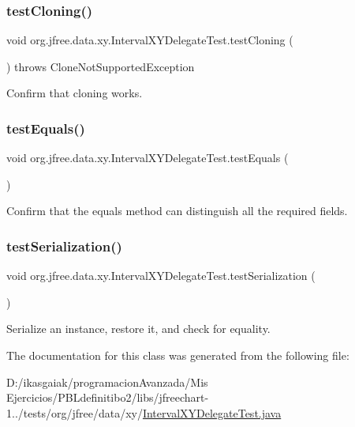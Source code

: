 \subsubsection{\texorpdfstring{test\+Cloning()}{testCloning()}}
{\footnotesize\ttfamily void org.\+jfree.\+data.\+xy.\+Interval\+X\+Y\+Delegate\+Test.\+test\+Cloning (\begin{DoxyParamCaption}{ }\end{DoxyParamCaption}) throws Clone\+Not\+Supported\+Exception}

Confirm that cloning works. \mbox{\label{classorg_1_1jfree_1_1data_1_1xy_1_1_interval_x_y_delegate_test_a9f0fd060226fb1b6f5d3c6d4da700bbd}} 
\subsubsection{\texorpdfstring{test\+Equals()}{testEquals()}}
{\footnotesize\ttfamily void org.\+jfree.\+data.\+xy.\+Interval\+X\+Y\+Delegate\+Test.\+test\+Equals (\begin{DoxyParamCaption}{ }\end{DoxyParamCaption})}

Confirm that the equals method can distinguish all the required fields. \mbox{\label{classorg_1_1jfree_1_1data_1_1xy_1_1_interval_x_y_delegate_test_a290f196722366a10a63b2bcd40270b77}} 
\subsubsection{\texorpdfstring{test\+Serialization()}{testSerialization()}}
{\footnotesize\ttfamily void org.\+jfree.\+data.\+xy.\+Interval\+X\+Y\+Delegate\+Test.\+test\+Serialization (\begin{DoxyParamCaption}{ }\end{DoxyParamCaption})}

Serialize an instance, restore it, and check for equality. 

The documentation for this class was generated from the following file\+:\begin{DoxyCompactItemize}
\item 
D\+:/ikasgaiak/programacion\+Avanzada/\+Mis Ejercicios/\+P\+B\+Ldefinitibo2/libs/jfreechart-\/1../tests/org/jfree/data/xy/\mbox{\hyperlink{_interval_x_y_delegate_test_8java}{Interval\+X\+Y\+Delegate\+Test.\+java}}\end{DoxyCompactItemize}
